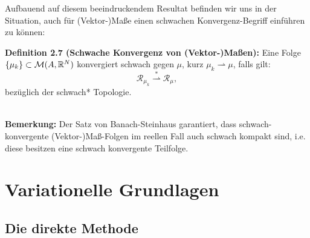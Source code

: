 Aufbauend auf diesem beeindruckendem Resultat befinden wir uns in der Situation, auch für (Vektor-)Maße einen schwachen Konvergenz-Begriff einführen zu können:\\[0.5cm]
\colorbox{generalYellow}{\begin{minipage}{16cm}{\textcolor{black}{}{\label{def2.7}}}
\textbf{Definition 2.7 (Schwache Konvergenz von (Vektor-)Maßen):} Eine Folge \(\{\mu_k\} \subset \mathcal{M}(A,\mathbb{R}^N)\) konvergiert schwach gegen \(\mu\), kurz \(\mu_k \rightharpoonup \mu\), falls gilt:
\begin{equation}
    \mathcal{R}_{\mu_k} \stackrel{*}{\rightharpoonup} \mathcal{R}_{\mu},
\end{equation}
bezüglich der schwach* Topologie.
\end{minipage}}\\

\textbf{Bemerkung:} Der Satz von Banach-Steinhaus garantiert, dass schwach-konvergente (Vektor-)Maß-Folgen im reellen Fall auch schwach kompakt sind, i.e. diese besitzen eine schwach konvergente Teilfolge. 
\section{Variationelle Grundlagen}{\label{sec:calcvar}}
\subsection{Die direkte Methode}{\label{subsec:direct}}

